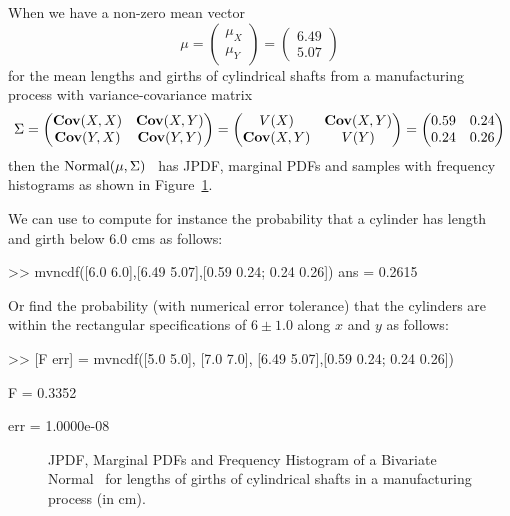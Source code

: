 When we have a non-zero mean vector 
$$\mu=\begin{pmatrix} \mu_X\\ \mu_Y \end{pmatrix} =\begin{pmatrix} 6.49\\ 5.07 \end{pmatrix}$$ 
for the mean lengths and girths of cylindrical shafts from a manufacturing process with  
variance-covariance matrix 
$$\Sigma = \begin{pmatrix} \mathbf{Cov}(X,X) & \mathbf{Cov}(X,Y)\\ \mathbf{Cov}(Y,X) & \mathbf{Cov}(Y,Y)\end{pmatrix} = \begin{pmatrix} V(X) & \mathbf{Cov}(X,Y)\\ \mathbf{Cov}(X,Y) & V(Y)\end{pmatrix} = \begin{pmatrix} 0.59 & 0.24\\ 0.24 & 0.26 \end{pmatrix}$$
then the $\mbox{{\rm Normal}}(\mu,\Sigma)$ \rv~has JPDF, marginal PDFs and samples with frequency histograms as shown in Figure~\ref{F:BivariateShaftsNormalJPDFMPDFsFreHist}.

We can use \Matlab to compute for instance the probability that a cylinder has length and girth below $6.0$ cms as follows:
\begin{VrbM}
>> mvncdf([6.0 6.0],[6.49 5.07],[0.59  0.24; 0.24 0.26])
ans =    0.2615
\end{VrbM}
Or find the probability (with numerical error tolerance) that the cylinders are within the rectangular specifications of $6\pm1.0$ along $x$ and $y$ as follows:
\begin{VrbM}
>> [F err] = mvncdf([5.0 5.0], [7.0 7.0], [6.49 5.07],[0.59  0.24; 0.24 0.26])

F =    0.3352

err =   1.0000e-08
\end{VrbM}


\begin{figure}[htpb]
\caption{JPDF, Marginal PDFs and Frequency Histogram of a Bivariate Normal \rv~for lengths of girths of cylindrical shafts in a manufacturing process (in cm).\label{F:BivariateShaftsNormalJPDFMPDFsFreHist}}
\centering   {}
\end{figure}



